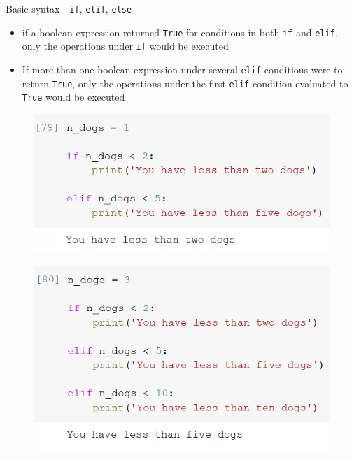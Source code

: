 \documentclass[aspectratio=169]{beamer}
\begin{document}
\begin{frame}{Basic syntax - \texttt{if}, \texttt{elif}, \texttt{else}}

	\begin{itemize}
		\item if a boolean expression returned \texttt{True} for conditions in both \texttt{if} and \texttt{elif}, only the operations  under \texttt{if} would be executed
		\item If more than one boolean expression under several \texttt{elif} conditions were to return \texttt{True}, only the operations under the first \texttt{elif} condition evaluated to \texttt{True} would be executed
	\end{itemize}

	\begin{multicols}{2}

		\begin{figure}
			\centering
			\includegraphics[width=\linewidth]{img/if_and_elif_true.png}
		\end{figure}
		\begin{figure}
			\centering
			\includegraphics[width=\linewidth]{img/elif_and_elif_true.png}
		\end{figure}

	\end{multicols}

\end{frame}
\end{document}
